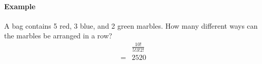 \paragraph*{Example}
A bag contains 5 red, 3 blue, and 2 green marbles. How many different ways can the marbles be arranged in a row?
\begin{align*}
    &\frac{10!}{5!3!2!} \\
    =& 2520
\end{align*}